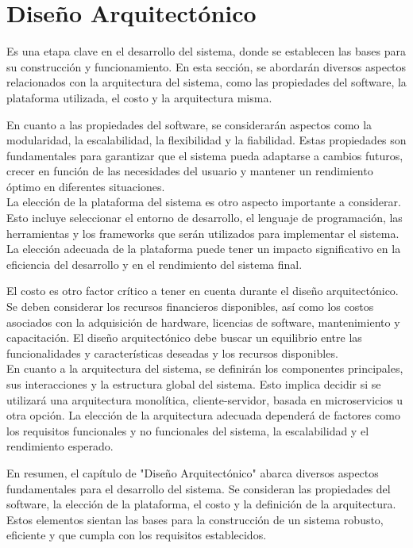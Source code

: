 \chapter{Diseño Arquitectónico}
\label{cap:reqUsr}

	Es una etapa clave en el desarrollo del sistema, donde se establecen las bases para su construcción y funcionamiento. En esta sección, se abordarán diversos aspectos relacionados con la arquitectura del sistema, como las propiedades del software, la plataforma utilizada, el costo y la arquitectura misma.

En cuanto a las propiedades del software, se considerarán aspectos como la modularidad, la escalabilidad, la flexibilidad y la fiabilidad. Estas propiedades son fundamentales para garantizar que el sistema pueda adaptarse a cambios futuros, crecer en función de las necesidades del usuario y mantener un rendimiento óptimo en diferentes situaciones.\\

La elección de la plataforma del sistema es otro aspecto importante a considerar. Esto incluye seleccionar el entorno de desarrollo, el lenguaje de programación, las herramientas y los frameworks que serán utilizados para implementar el sistema. La elección adecuada de la plataforma puede tener un impacto significativo en la eficiencia del desarrollo y en el rendimiento del sistema final.

El costo es otro factor crítico a tener en cuenta durante el diseño arquitectónico. Se deben considerar los recursos financieros disponibles, así como los costos asociados con la adquisición de hardware, licencias de software, mantenimiento y capacitación. El diseño arquitectónico debe buscar un equilibrio entre las funcionalidades y características deseadas y los recursos disponibles.\\

En cuanto a la arquitectura del sistema, se definirán los componentes principales, sus interacciones y la estructura global del sistema. Esto implica decidir si se utilizará una arquitectura monolítica, cliente-servidor, basada en microservicios u otra opción. La elección de la arquitectura adecuada dependerá de factores como los requisitos funcionales y no funcionales del sistema, la escalabilidad y el rendimiento esperado.

En resumen, el capítulo de "Diseño Arquitectónico" abarca diversos aspectos fundamentales para el desarrollo del sistema. Se consideran las propiedades del software, la elección de la plataforma, el costo y la definición de la arquitectura. Estos elementos sientan las bases para la construcción de un sistema robusto, eficiente y que cumpla con los requisitos establecidos.


